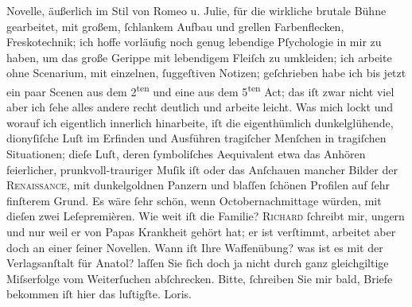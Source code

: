 \begin{ledgroupsized}[t]{13cm}
               Novelle, äußerlich im Stil von Romeo u. Julie, für
               die wirkliche brutale Bühne gearbeitet, mit {\pb}großem, ſchlankem Aufbau und
               grellen Farbenflecken, Freskotechnik; ich hoffe vorläufig noch genug lebendige
               Pſychologie in mir zu haben, um das große Gerippe mit lebendigem Fleiſch zu
               umkleiden; ich arbeite ohne Scenarium, mit einzelnen, ſuggeſtiven Notizen;
               geſchrieben habe ich bis jetzt ein paar Scenen aus dem 2\textsuperscript{ten} und eine aus dem 5\textsuperscript{ten} Act; das iſt zwar
               nicht viel aber ich ſehe alles andere recht deutlich und arbeite leicht. Was mich
               lockt und worauf ich eigentlich innerlich hinarbeite, iſt die eigenthümlich
               dunkelglühende, dionyſiſche Luſt im Erfinden und Ausführen tragiſcher Menſchen in
               tragiſchen Situationen; dieſe Luſt, deren ſymboliſches Aequivalent etwa das Anhören
                  {\pb}feierlicher,
               prunkvoll-trauriger Muſik iſt oder das Anſchauen mancher Bilder der \textsc{Renaissance}, mit dunkelgoldnen Panzern und blaſſen ſchönen
               Profilen auf ſehr finſterem Grund. Es wäre ſehr schön, wenn Octobernachmittage
               würden, mit dieſen zwei Leſepremièren. Wie weit iſt die Familie? \hspace*{2em}\textsc{Richard}{ }ſchreibt mir, ungern und nur weil er von Papas Krankheit gehört hat; er
               ist verſtimmt, arbeitet aber doch an einer ſeiner Novellen. Wann iſt Ihre Waffenübung? was ist es mit der
               Verlagsanſtalt für Anatol? laſſen Sie ſich doch ja
               nicht durch ganz gleichgiltige Miſserfolge vom Weiterſuchen abſchrecken. Bitte,
               ſchreiben Sie mir bald, Briefe bekommen iſt hier das luſtigſte.\pend
           \pstart \spacefill\mbox{Loris.}\pend{}\endnumbering{}\end{ledgroupsized}  \newcommand{\dateiname}{L00105}\newcommand{\titel}{Hugo von Hofmannsthal an Arthur Schnitzler, 19. 7. [1892]}\newcommand{\editorInnen}{ Martin Anton Müller und Gerd-Hermann Susen}
      